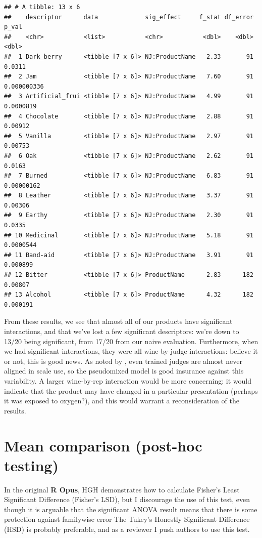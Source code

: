 \documentclass[
]{book}
\begin{document}
\begin{verbatim}
## # A tibble: 13 x 6
##    descriptor      data             sig_effect     f_stat df_error       p_val
##    <chr>           <list>           <chr>           <dbl>    <dbl>       <dbl>
##  1 Dark_berry      <tibble [7 x 6]> NJ:ProductName   2.33       91 0.0311     
##  2 Jam             <tibble [7 x 6]> NJ:ProductName   7.60       91 0.000000336
##  3 Artificial_frui <tibble [7 x 6]> NJ:ProductName   4.99       91 0.0000819  
##  4 Chocolate       <tibble [7 x 6]> NJ:ProductName   2.88       91 0.00912    
##  5 Vanilla         <tibble [7 x 6]> NJ:ProductName   2.97       91 0.00753    
##  6 Oak             <tibble [7 x 6]> NJ:ProductName   2.62       91 0.0163     
##  7 Burned          <tibble [7 x 6]> NJ:ProductName   6.83       91 0.00000162 
##  8 Leather         <tibble [7 x 6]> NJ:ProductName   3.37       91 0.00306    
##  9 Earthy          <tibble [7 x 6]> NJ:ProductName   2.30       91 0.0335     
## 10 Medicinal       <tibble [7 x 6]> NJ:ProductName   5.18       91 0.0000544  
## 11 Band-aid        <tibble [7 x 6]> NJ:ProductName   3.91       91 0.000899   
## 12 Bitter          <tibble [7 x 6]> ProductName      2.83      182 0.00807    
## 13 Alcohol         <tibble [7 x 6]> ProductName      4.32      182 0.000191
\end{verbatim}

From these results, we see that almost all of our products have significant interactions, and that we've lost a few significant descriptors: we're down to 13/20 being significant, from 17/20 from our naive evaluation. Furthermore, when we had significant interactions, they were all wine-by-judge interactions: believe it or not, this is good news. As noted by \citet{brockhoffTaking2015}, even trained judges are almost never aligned in scale use, so the pseudomixed model is good insurance against this variability. A larger wine-by-rep interaction would be more concerning: it would indicate that the product may have changed in a particular presentation (perhaps it was exposed to oxygen?), and this would warrant a reconsideration of the results.

\section{Mean comparison (post-hoc testing)}\label{mean-comparison-post-hoc-testing}

In the original \textbf{R Opus}, HGH demonstrates how to calculate Fisher's Least Significant Difference (Fisher's LSD), but I discourage the use of this test, even though it is arguable that the significant ANOVA result means that there is some protection against familywise error \citep{rencherMethods2002} The Tukey's Honestly Significant Difference (HSD) is probably preferable, and as a reviewer I push authors to use this test.
\end{document}
